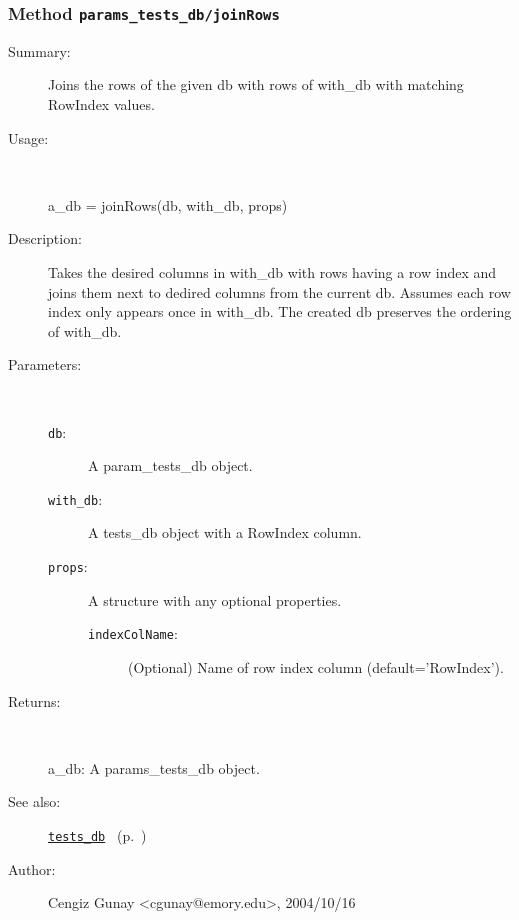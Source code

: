 \subsubsection[Method \texttt{joinRows}]{Method \texttt{params\_tests\_db/joinRows}}%
%
\label{ref_params_tests_db__joinRows}%
\hypertarget{ref_params_tests_db__joinRows}{}%
\begin{description}
\item[Summary:]Joins the rows of the given db with rows of with\_db with matching
  	RowIndex values.
%
\item[Usage:]~%
\begin{lyxcode}%
a\_db = joinRows(db, with\_db, props)
%
\end{lyxcode}%
%
\item[Description:]%
Takes the desired columns in with\_db with rows having a 
 row index and joins them next to dedired columns from the current db. 
 Assumes each row index only appears once in with\_db. The created
 db preserves the ordering of with\_db.
\item[Parameters:]~
\begin{description}%
\item[\texttt{db}:]
 A param\_tests\_db object.
\item[\texttt{with\_db}:]
 A tests\_db object with a RowIndex column.
\item[\texttt{props}:]
 A structure with any optional properties.
\begin{description}%
\item[\texttt{indexColName}:]
 (Optional) Name of row index column (default='RowIndex').
\end{description}%
\end{description}%
%
\item[Returns:
]~

	a\_db: A params\_tests\_db object.
%
%
\item[See also:]%
\hyperlink{ref_tests_db}{\texttt{tests\_db}}%
\ (p.~\pageref{ref_tests_db})%
%
%
\item[Author:]%
Cengiz Gunay <cgunay@emory.edu>, 2004/10/16
%
\end{description}
\methodline%
